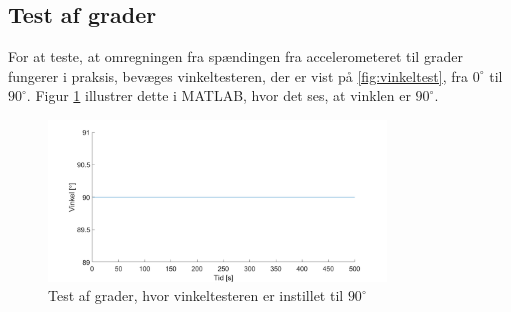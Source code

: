 \subsection{Test af grader}

For at teste, at omregningen fra spændingen fra accelerometeret til grader fungerer i praksis, bevæges vinkeltesteren, der er vist på \autoref{fig:vinkeltest}, fra $0^{\circ}$ til $90^{\circ}$. Figur \ref{fig:Grader_test} illustrer dette i MATLAB, hvor det ses, at vinklen er $90^{\circ}$. 

\begin{figure}[H]
\centering
\includegraphics[width=0.8\textwidth]{figures/Grader_test}
\caption{Test af grader, hvor vinkeltesteren er instillet til $90^{\circ}$ }
\label{fig:Grader_test}
\end{figure}